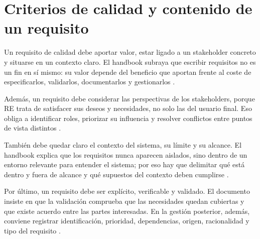 \section{Criterios de calidad y contenido de un requisito}
Un requisito de calidad debe aportar valor, estar ligado a un stakeholder concreto y situarse en un contexto claro. El handbook subraya que escribir requisitos no es un fin en s\'i mismo: su valor depende del beneficio que aportan frente al coste de especificarlos, validarlos, documentarlos y gestionarlos \cite[pp.~16--17]{cpre}.

Adem\'as, un requisito debe considerar las perspectivas de los stakeholders, porque RE trata de satisfacer sus deseos y necesidades, no solo las del usuario final. Eso obliga a identificar roles, priorizar su influencia y resolver conflictos entre puntos de vista distintos \cite[pp.~18--19]{cpre}.

Tambi\'en debe quedar claro el contexto del sistema, su l\'imite y su alcance. El handbook explica que los requisitos nunca aparecen aislados, sino dentro de un entorno relevante para entender el sistema; por eso hay que delimitar qu\'e est\'a dentro y fuera de alcance y qu\'e supuestos del contexto deben cumplirse \cite[pp.~22--24]{cpre}.

Por \'ultimo, un requisito debe ser expl\'icito, verificable y validado. El documento insiste en que la validaci\'on comprueba que las necesidades quedan cubiertas y que existe acuerdo entre las partes interesadas. En la gesti\'on posterior, adem\'as, conviene registrar identificaci\'on, prioridad, dependencias, origen, racionalidad y tipo del requisito \cite[pp.~109--111, 136--137]{cpre}.